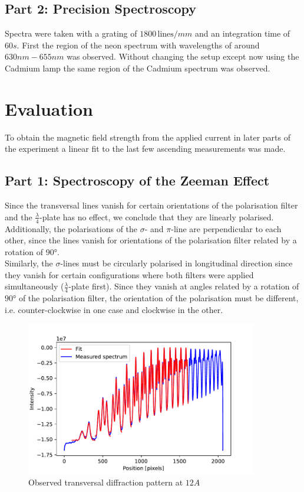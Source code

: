 \documentclass[12pt]{article}
\begin{document}
\subsection{Part 2: Precision Spectroscopy}
Spectra were taken with a grating of $1800\, \text{lines}/mm$ and an integration time of $60 s$. First the region of the neon spectrum with wavelengths of around $630nm-655nm$ was observed. Without changing the setup except now using the Cadmium lamp the same region of the Cadmium spectrum was observed. 
\section{Evaluation}
	To obtain the magnetic field strength from the applied current in later parts of the experiment a linear fit to the last few ascending measurements was made. 
\subsection{Part 1: Spectroscopy of the Zeeman Effect}
	Since the transversal lines vanish for certain orientations of the polarisation filter and the $\frac{\lambda}{4}$-plate has no effect, we conclude that they are linearly polarised. Additionally, the polarisations of the $\sigma$- and $\pi$-line are perpendicular to each other, since the lines vanish for orientations of the polarisation filter related by a rotation of $\ang{90}$.\\
	Similarly, the $\sigma$-lines must be circularly polarised in longitudinal direction since they vanish for certain configurations where both filters were applied simultaneously ($\frac{\lambda}{4}$-plate first). Since they vanish at angles related by a rotation of $\ang{90}$ of the polarisation filter, the orientation of the polarisation must be different, i.e. counter-clockwise in one case and clockwise in the other.\\
\begin{figure}
\centering
\label{fig:master12_A}
\includegraphics[width=0.9\textwidth]{fig/master12A.pdf}
\caption{Observed transversal diffraction pattern at $12A$}
\end{figure}
\end{document}
